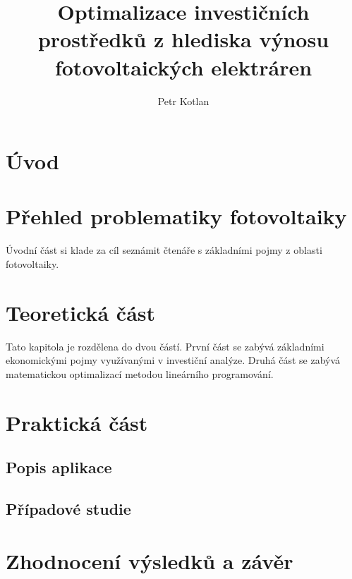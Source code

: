 \documentclass[a4paper, 12pt]{report}
\author{Petr Kotlan}
\title{Optimalizace investičních prostředků z hlediska výnosu fotovoltaických elektráren}
\date{}
\begin{document}

\thispagestyle{empty}
\mbox{}




\thispagestyle{empty}
\mbox{}
\newpage



\thispagestyle{empty}
\mbox{}
\newpage



\thispagestyle{empty}
\mbox{}
\newpage

\tableofcontents

\renewcommand{\chaptername}{Úvod}
\chapter*{Úvod}

\chapter{Přehled problematiky fotovoltaiky}
\renewcommand{\chaptername}{Přehled problematiky fotovoltaiky}

Úvodní část si klade za cíl seznámit čtenáře s základními pojmy z oblasti fotovoltaiky.



\chapter{Teoretická část}
\renewcommand{\chaptername}{Teoretická část}

Tato kapitola je rozdělena do dvou částí. První část se zabývá základními ekonomickými pojmy využívanými v investiční analýze.
Druhá část se zabývá matematickou optimalizací metodou lineárního programování.





\chapter{Praktická část}
\renewcommand{\chaptername}{Praktická část}

\section{Popis aplikace}



\section{Případové studie}

\renewcommand{\chaptername}{Zhodnocení výsledků a závěr}
\chapter{Zhodnocení výsledků a závěr}



\end{document}
